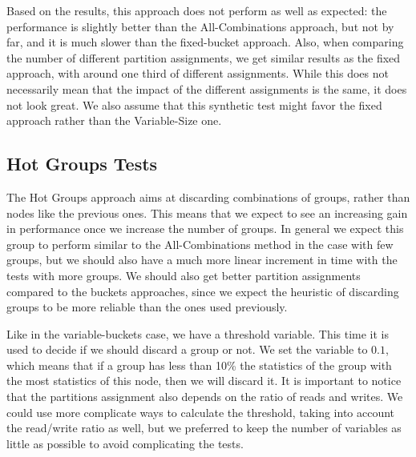 Based on the results, this approach does not perform as well as expected: the performance is slightly better than the All-Combinations approach, but not by far, and it is much slower than the fixed-bucket approach. Also, when comparing the number of different partition assignments, we get similar results as the fixed approach, with around one third of different assignments. While this does not necessarily mean that the impact of the different assignments is the same, it does not look great. We also assume that this synthetic test might favor the fixed approach rather than the Variable-Size one.

\subsection{Hot Groups Tests}\label{sec:hot-groups-tests}
The Hot Groups approach aims at discarding combinations of groups, rather than nodes like the previous ones. This means that we expect to see an increasing gain in performance once we increase the number of groups. In general we expect this group to perform similar to the All-Combinations method in the case with few groups, but we should also have a much more linear increment in time with the tests with more groups. We should also get better partition assignments compared to the buckets approaches, since we expect the heuristic of discarding groups to be more reliable than the ones used previously.

Like in the variable-buckets case, we have a threshold variable. This time it is used to decide if we should discard a group or not. We set the variable to $0.1$, which means that if a group has less than 10\% the statistics of the group with the most statistics of this node, then we will discard it. It is important to notice that the partitions assignment also depends on the ratio of reads and writes. We could use more complicate ways to calculate the threshold, taking into account the read/write ratio as well, but we preferred to keep the number of variables as little as possible to avoid complicating the tests.

